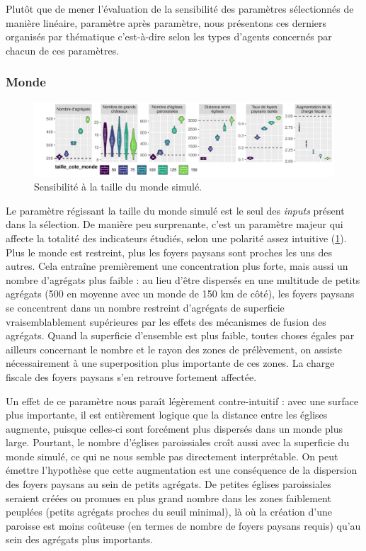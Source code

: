 Plutôt que de mener l'évaluation de la sensibilité des paramètres sélectionnés de manière linéaire, paramètre après paramètre, nous présentons ces derniers organisés par thématique c'est-à-dire selon les types d'agents concernés par chacun de ces paramètres.

\subsubsection{Monde}

\begin{figure}[H]
	\centering
	\includegraphics[width=\linewidth]{img/sensib/sensibilite_taille_cote_monde.pdf}
	\caption{Sensibilité à la taille du monde simulé.}
	\label{fig:sensib-monde}
\end{figure}

Le paramètre régissant la taille du monde simulé est le seul des \textit{inputs} présent dans la sélection.
De manière peu surprenante, c'est un paramètre majeur qui affecte la totalité des indicateurs étudiés, selon une polarité assez intuitive (\cref{fig:sensib-monde}).
Plus le monde est restreint, plus les foyers paysans sont proches les uns des autres.
Cela entraîne premièrement une concentration plus forte, mais aussi un nombre d'agrégats plus faible : au lieu d'être dispersés en une multitude de petits agrégats (500 en moyenne avec un monde de 150 km de côté), les foyers paysans se concentrent dans un nombre restreint d'agrégats de superficie vraisemblablement supérieures par les effets des mécanismes de fusion des agrégats.
Quand la superficie d'ensemble est plus faible, toutes choses égales par ailleurs concernant le nombre et le rayon des zones de prélèvement, on assiste nécessairement à une superposition plus importante de ces zones.
La charge fiscale des foyers paysans s'en retrouve fortement affectée.

Un effet de ce paramètre nous paraît légèrement contre-intuitif : avec une surface plus importante, il est entièrement logique que la distance entre les églises augmente, puisque celles-ci sont forcément plus dispersés dans un monde plus large.
Pourtant, le nombre d'églises paroissiales croît aussi avec la superficie du monde simulé, ce qui ne nous semble pas directement interprétable.
On peut émettre l'hypothèse que cette augmentation est une conséquence de la dispersion des foyers paysans au sein de petits agrégats.
De petites églises paroissiales seraient créées ou promues en plus grand nombre dans les zones faiblement peuplées (petits agrégats proches du seuil minimal), là où la création d'une paroisse est moins coûteuse (en termes de nombre de foyers paysans requis) qu'au sein des agrégats plus importants.

